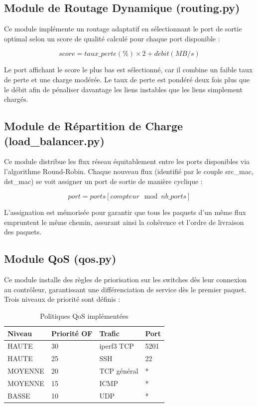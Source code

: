 \documentclass[12pt,a4paper]{report}
\begin{document}
\subsection{Module de Routage Dynamique (routing.py)}
Ce module implémente un routage adaptatif en sélectionnant
le port de sortie optimal selon un score de qualité
calculé pour chaque port disponible :

\begin{equation}
score = taux\_perte(\%) \times 2 + d\acute{e}bit(MB/s)
\label{eq:score}
\end{equation}

Le port affichant le score le plus bas est sélectionné,
car il combine un faible taux de perte et une charge
modérée. Le taux de perte est pondéré deux fois plus
que le débit afin de pénaliser davantage les liens
instables que les liens simplement chargés.

\subsection{Module de Répartition de Charge (load\_balancer.py)}
Ce module distribue les flux réseau équitablement entre
les ports disponibles via l'algorithme Round-Robin.
Chaque nouveau flux (identifié par le couple src\_mac,
dst\_mac) se voit assigner un port de sortie de manière
cyclique :

\begin{equation}
port = ports[compteur \mod nb\_ports]
\label{eq:rr}
\end{equation}

L'assignation est mémorisée pour garantir que tous les
paquets d'un même flux empruntent le même chemin, assurant
ainsi la cohérence et l'ordre de livraison des paquets.

\subsection{Module QoS (qos.py)}
Ce module installe des règles de priorisation sur les
switches dès leur connexion au contrôleur, garantissant
une différenciation de service dès le premier paquet.
Trois niveaux de priorité sont définis :

\begin{table}[H]
\centering
\caption{Politiques QoS implémentées}
\label{tab:qos}
\begin{tabular}{llll}
\toprule
\textbf{Niveau} & \textbf{Priorité OF} &
\textbf{Trafic} & \textbf{Port} \\
\midrule
HAUTE & 30 & iperf3 TCP & 5201 \\
HAUTE & 25 & SSH & 22 \\
MOYENNE & 20 & TCP général & * \\
MOYENNE & 15 & ICMP & * \\
BASSE & 10 & UDP & * \\
\bottomrule
\end{tabular}
\end{table}
\end{document}
